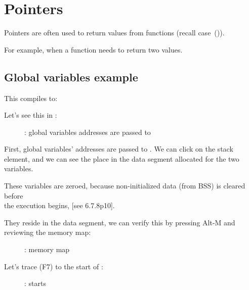 \section{Pointers}
\myindex{\CLanguageElements!\Pointers}
\label{label_pointers}

Pointers are often used to return values from functions (recall \scanf case~()).

For example, when a function needs to return two values.

\subsection{Global variables example}



This compiles to:



\myindex{\olly}
\clearpage
Let's see this in \olly:

\begin{figure}[H]
\centering
{}
\caption{\olly: 
global variables addresses are passed to \ttfone}
\label{fig:pointers_olly_global_1}
\end{figure}

First, global variables' addresses are passed to \ttfone.
We can click  
on the stack element, and we can see the place in the data segment allocated 
for the two variables.

\clearpage
These variables are zeroed, because non-initialized data (from \ac{BSS}) is cleared before\\
the execution begins, [see \CNineNineStd{} 6.7.8p10].

They reside in the data segment, we can verify this by pressing Alt-M and reviewing the memory map:

\begin{figure}[H]
\centering
{}
\caption{\olly: memory map}
\label{fig:pointers_olly_global_5}
\end{figure}

\clearpage
Let's trace (F7) to the start of \ttfone: 

\begin{figure}[H]
\centering
{}
\caption{\olly: \ttfone starts}
\label{fig:pointers_olly_global_2}
\end{figure}

